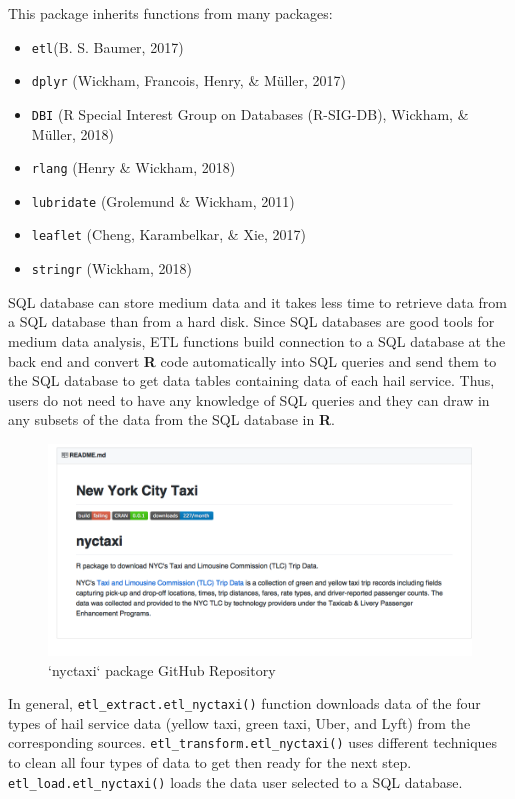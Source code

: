 \documentclass[12pt,twoside]{reedthesis}
\providecommand{\tightlist}{%
  \setlength{\itemsep}{0pt}\setlength{\parskip}{0pt}}
\theoremstyle{definition}
\theoremstyle{definition}
\theoremstyle{definition}
\theoremstyle{remark}
\begin{document}
This package inherits functions from many packages:
\begin{itemize}
\tightlist
\item
  \texttt{etl}(B. S. Baumer, 2017)
\item
  \texttt{dplyr} (Wickham, Francois, Henry, \& Müller, 2017)
\item
  \texttt{DBI} (R Special Interest Group on Databases (R-SIG-DB),
  Wickham, \& Müller, 2018)
\item
  \texttt{rlang} (Henry \& Wickham, 2018)
\item
  \texttt{lubridate} (Grolemund \& Wickham, 2011)
\item
  \texttt{leaflet} (Cheng, Karambelkar, \& Xie, 2017)
\item
  \texttt{stringr} (Wickham, 2018)
\end{itemize}
SQL database can store medium data and it takes less time to retrieve
data from a SQL database than from a hard disk. Since SQL databases are
good tools for medium data analysis, ETL functions build connection to a
SQL database at the back end and convert \textbf{R} code automatically
into SQL queries and send them to the SQL database to get data tables
containing data of each hail service. Thus, users do not need to have
any knowledge of SQL queries and they can draw in any subsets of the
data from the SQL database in \textbf{R}.
\begin{figure}[h]

{\centering \includegraphics[width=5.88in]{figure/nyctaxi-page} 

}

\caption{`nyctaxi` package GitHub Repository}\label{fig:nyctaxi-page}
\end{figure}
In general, \texttt{etl\_extract.etl\_nyctaxi()} function downloads data
of the four types of hail service data (yellow taxi, green taxi, Uber,
and Lyft) from the corresponding sources.
\texttt{etl\_transform.etl\_nyctaxi()} uses different techniques to
clean all four types of data to get then ready for the next step.
\texttt{etl\_load.etl\_nyctaxi()} loads the data user selected to a SQL
database.
\end{document}
